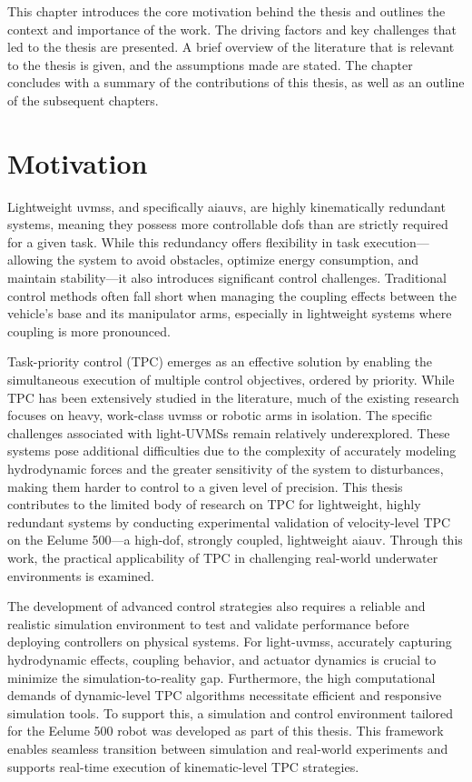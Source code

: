 \label{ch:introduction}
This chapter introduces the core motivation behind the thesis and outlines the
context and importance of the work. The driving factors and key challenges that
led to the thesis are presented. A brief overview of the literature that is
relevant to the thesis is given, and the assumptions made are
stated. The chapter concludes with a summary of the contributions of this thesis,
as well as an outline of the subsequent chapters.

\section{Motivation}
\label{sec:introduction:motivation}


Lightweight \glspl{uvms}, and specifically \glspl{aiauv}, are highly kinematically redundant systems, meaning they possess more controllable \glspl{dof} than are strictly required for a given task. While this redundancy offers flexibility in task execution—allowing the system to avoid obstacles, optimize energy consumption, and maintain stability—it also introduces significant control challenges. Traditional control methods often fall short when managing the coupling effects between the vehicle's base and its manipulator arms, especially in lightweight systems where coupling is more pronounced.

Task-priority control (TPC) emerges as an effective solution by enabling the simultaneous execution of multiple control objectives, ordered by priority. While TPC has been extensively studied in the literature, much of the existing research focuses on heavy, work-class \glspl{uvms} or robotic arms in isolation. The specific challenges associated with light-UVMSs remain relatively underexplored. These systems pose additional difficulties due to the complexity of accurately modeling hydrodynamic forces and the greater sensitivity of the system to disturbances, making them harder to control to a given level of precision.
This thesis contributes to the limited body of research on TPC for lightweight, highly redundant systems by conducting experimental validation of velocity-level TPC on the Eelume 500—a high-\gls{dof}, strongly coupled, lightweight \gls{aiauv}. Through this work, the practical applicability of TPC in challenging real-world underwater environments is examined.

The development of advanced control strategies also requires a reliable and realistic simulation environment to test and validate performance before deploying controllers on physical systems. For light-\gls{uvms}s, accurately capturing hydrodynamic effects, coupling behavior, and actuator dynamics is crucial to minimize the simulation-to-reality gap. Furthermore, the high computational demands of dynamic-level TPC algorithms necessitate efficient and responsive simulation tools.
To support this, a simulation and control environment tailored for the Eelume 500 robot was developed as part of this thesis. This framework enables seamless transition between simulation and real-world experiments and supports real-time execution of kinematic-level TPC strategies.

